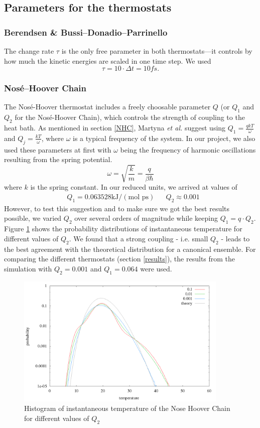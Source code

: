 \subsection{Parameters for the thermostats}
\subsubsection{Berendsen \& Bussi--Donadio--Parrinello}
The change rate $\tau$ is the only free parameter in both thermostats---it controls by how much the kinetic energies are scaled in one time step. We used 
\begin{equation}
\tau = 10\cdot \Delta t = 10fs\text{.}
\end{equation}

\subsubsection{Nosé--Hoover Chain}
The Nosé-Hoover thermostat includes a freely choosable parameter $Q$ (or $Q_1$ and $Q_2$ for the Nosé-Hoover Chain), which controls the strength of coupling to the heat bath. As mentioned in section \ref{NHC}, Martyna \textit{et al.} \cite{Martyna1992} suggest using $Q_1 = \frac{qkT}{\omega}$ and $Q_j = \frac{kT}{\omega}$, where $\omega$ is a typical frequency of the system. In our project, we also used these parameters at first with $\omega$ being the frequency of harmonic oscillations resulting from the spring potential.
\begin{equation}
\omega = \sqrt{\frac{k}{m}} = \frac{q}{\beta \hbar}
\end{equation} 
where $k$ is the spring constant. In our reduced units, we arrived at values of 
\begin{align*}
& Q_1 = 0.063528 \text{kJ}/(\text{mol ps}) && Q_2 \approx 0.001
\end{align*} 
However, to test this suggestion and to make sure we got the best results possible, we varied $Q_2$ over several orders of magnitude while keeping $Q_1 = q\cdot Q_2$. Figure \ref{im:temp_chain} shows the probability distributions of instantaneous temperature for different values of $Q_2$. We found that a strong coupling - i.e. small $Q_2$ - leads to the best agreement with the theoretical distribution for a canonical ensemble. For comparing the different thermostats (section \ref{results}), the results from the simulation with $Q_2 = 0.001$ and $Q_1 = 0.064$ were used. 

\begin{figure}[H]
\centering
\includegraphics[width=0.9\textwidth]{./graphics/Histogramm_tempCol_one_Chain.png}
\caption{Histogram of instantaneous temperature of the Nose Hoover Chain for different values of $Q_2$ }
\label{im:temp_chain}
\end{figure}



